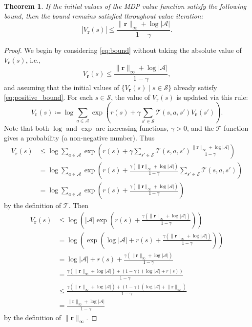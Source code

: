 \documentclass{article}
\newtheorem{theorem}{Theorem}[section]
\theoremstyle{definition}
\newcommand{\rinf}{\lVert \mathbf{r} \rVert_\infty}
\newcommand{\vbound}{\frac{\rinf + \log|\mathcal{A}|}{1 - \gamma}}
\begin{document}
\begin{theorem} \label{thm:bound}
  If the initial values of the MDP value function satisfy the following
  bound, then the bound remains satisfied throughout value iteration:
  \begin{equation} \label{eq:bound}
    |V_{\mathbf{r}}(s)| \le \vbound.
  \end{equation}
\end{theorem}
\begin{proof}
  We begin by considering \eqref{eq:bound} without taking the absolute value of
  $V_{\mathbf{r}}(s)$, i.e.,
  \begin{equation} \label{eq:positive_bound}
    V_{\mathbf{r}}(s) \le \vbound,
  \end{equation}
  and assuming that the initial values of $\{ V_{\mathbf{r}}(s) \mid s \in
  \mathcal{S} \}$ already satisfy \eqref{eq:positive_bound}. For each $s \in
  \mathcal{S}$, the value of $V_{\mathbf{r}}(s)$ is updated via this rule:
  \[ V_{\mathbf{r}}(s) \coloneqq \log \sum_{a \in \mathcal{A}} \exp\left( r(s) +
      \gamma\sum_{s' \in \mathcal{S}} \mathcal{T}(s, a, s')V_{\mathbf{r}}(s') \right). \]
  Note that both $\log$ and $\exp$ are increasing functions, $\gamma > 0$, and
  the $\mathcal{T}$ function gives a probability (a non-negative number).
  Thus
  \[
    \begin{split}
      V_{\mathbf{r}}(s) &\le \log \sum_{a \in \mathcal{A}} \exp\left( r(s) + \gamma\sum_{s'
          \in \mathcal{S}} \mathcal{T}(s, a, s')\frac{\rinf +
          \log|\mathcal{A}|}{1 - \gamma} \right) \\
      &= \log \sum_{a \in \mathcal{A}} \exp\left( r(s) + \frac{\gamma (\rinf +
          \log|\mathcal{A}|)}{1 - \gamma}\sum_{s' \in \mathcal{S}}
        \mathcal{T}(s, a, s') \right) \\
      &= \log \sum_{a \in \mathcal{A}} \exp\left( r(s) + \frac{\gamma (\rinf +
          \log|\mathcal{A}|)}{1 - \gamma} \right)
    \end{split}
  \]
  by the definition of $\mathcal{T}$. Then
  \[
    \begin{split}
      V_{\mathbf{r}}(s) &\le \log \left( |\mathcal{A}| \exp\left( r(s) + \frac{\gamma
            (\rinf + \log|\mathcal{A}|)}{1 - \gamma} \right) \right) \\
      &= \log \left( \exp\left( \log|\mathcal{A}| + r(s) + \frac{\gamma
            (\rinf + \log|\mathcal{A}|)}{1 - \gamma} \right) \right) \\
      &= \log|\mathcal{A}| + r(s) + \frac{\gamma (\rinf + \log|\mathcal{A}|)}{1 - \gamma} \\
      &= \frac{\gamma (\rinf + \log|\mathcal{A}|) + (1 -
        \gamma)(\log|\mathcal{A}| + r(s))}{1 - \gamma} \\
      &\le \frac{\gamma (\rinf + \log|\mathcal{A}|) + (1 -
        \gamma)(\log|\mathcal{A}| + \rinf)}{1 - \gamma} \\
      &= \vbound
    \end{split}
  \]
  by the definition of $\rinf$.


\end{proof}
\end{document}
